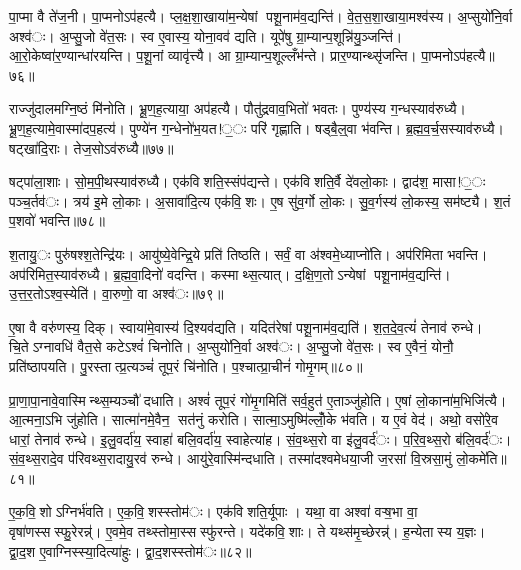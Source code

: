 पा॒प्मा वै ते॑ज॒नी। पा॒प्मनोऽप॑हत्यै। प्ल॒क्ष॒शा॒खाया॑म॒न्येषां पशू॒नाम॑व॒द्यन्ति॑। वे॒त॒स॒शा॒खाया॒मश्व॑स्य। अ॒प्सुयो॑नि॒र्वा अश्व॑ः। अ॒प्सु॒जो वे॑त॒सः। स्व ए॒वास्य॒ योना॒वव॑ द्यति। यूपे॑षु ग्रा॒म्यान्प॒शून्नि॑यु॒ञ्जन्ति॑। आ॒रो॒केष्वा॑र॒ण्यान्धा॑रयन्ति। प॒शू॒नां व्यावृ॑त्त्यै। आ ग्रा॒म्यान्प॒शूल्लँभ॑न्ते। प्रार॒ण्यान्थ्सृ॑जन्ति। पा॒प्मनोऽप॑हत्यै॥७६॥


राज्जु॑दालमग्नि॒ष्ठं मि॑नोति। भ्रू॒ण॒ह॒त्याया॒ अप॑हत्यै। पौतु॑द्रवाव॒भितो॑ भवतः। पुण्य॑स्य ग॒न्धस्याव॑रुध्यै। भ्रू॒ण॒ह॒त्यामे॒वास्मा॑दप॒हत्य॑। पुण्ये॑न ग॒न्धेनो॑भ॒यत!॒ः परि॑ गृह्णाति। षड्बै॒ल्॒वा भ॑वन्ति। ब्र॒ह्म॒व॒र्च॒सस्याव॑रुध्यै। षट्खा॑दि॒राः। तेज॒सोऽव॑रुध्यै॥७७॥

षट्पा॑ला॒शाः। सो॒म॒पी॒थस्याव॑रुध्यै। एक॑विशति॒स्संप॑द्यन्ते। एक॑विशति॒र्वै दे॑वलो॒काः। द्वाद॑श॒ मासा!॒ः पञ्च॒र्तव॑ः। त्रय॑ इ॒मे लो॒काः। अ॒सावा॑दि॒त्य एक॑वि॒शः। ए॒ष सु॑व॒र्गो लो॒कः। सु॒व॒र्गस्य॑ लो॒कस्य॒ सम॑ष्ट्यै। श॒तं प॒शवो॑ भवन्ति॥७८॥

श॒तायु॒ः पुरु॑षश्श॒तेन्द्रि॑यः। आयु॑ष्ये॒वेन्द्रि॒ये प्रति॑ तिष्ठति। सर्वं॒ वा अ॑श्वमे॒ध्याप्नो॑ति। अप॑रिमिता भवन्ति। अप॑रिमित॒स्याव॑रुध्यै। ब्र॒ह्म॒वा॒दिनो॑ वदन्ति। कस्माथ्स॒त्यात्। द॒क्षि॒ण॒तोऽन्येषां पशू॒नाम॑व॒द्यन्ति॑। उ॒त्त॒र॒तोऽश्व॒स्येति॑। वा॒रुणो॒ वा अश्व॑ः॥७९॥

ए॒षा वै वरु॑णस्य॒ दिक्। स्वाया॑मे॒वास्य॑ दि॒श्यव॑द्यति। यदित॑रेषां पशू॒नाम॑व॒द्यति॑। श॒त॒दे॒व॒त्यं॑ तेनाव॑ रुन्धे। चि॒तेऽग्नावधि॑ वैत॒से कटेऽश्वं॑ चिनोति। अ॒प्सुयो॑नि॒र्वा अश्व॑ः। अ॒प्सु॒जो वे॑त॒सः। स्व ए॒वैनं॒ योनौ॒ प्रति॑ष्ठापयति। पु॒रस्तात्प्र॒त्यञ्चं॑ तूप॒रं चि॑नोति। प॒श्चात्प्रा॒चीनं॑ गोमृ॒गम्॥८०॥

प्रा॒णा॒पा॒नावे॒वास्मिन्थ्स॒म्यञ्चौ॑ दधाति। अश्वं॑ तूप॒रं गो॑मृ॒गमिति॑ सर्व॒हुत॑ ए॒ताञ्जु॑होति। ए॒षां लो॒काना॑म॒भिजि॑त्यै। आ॒त्मना॒ऽभि जु॑होति। सात्मा॑नमे॒वैन॒ सत॑नुं करोति। सात्मा॒ऽमुष्मि॑ल्लोँ॒के भ॑वति। य ए॒वं वेद॑। अथो॒ वसो॑रे॒व धारां॒ तेनाव॑ रुन्धे। इ॒लु॒वर्दा॑य॒ स्वाहा॑ बलि॒वर्दा॑य॒ स्वाहेत्या॑ह। सं॒व॒थ्स॒रो वा इ॑लु॒वर्द॑ः। प॒रि॒व॒थ्स॒रो ब॑लि॒वर्द॑ः। सं॒व॒थ्स॒रादे॒व प॑रिवथ्स॒रादायु॒रव॑ रुन्धे। आयु॑रे॒वास्मि॑न्दधाति। तस्मा॑दश्वमेधया॒जी ज॒रसा॑ वि॒स्रसा॒मुं लो॒कमे॑ति॥८१॥


ए॒क॒वि॒शोऽग्निर्भ॑वति। ए॒क॒वि॒शस्स्तोम॑ः। एक॑विशति॒र्यूपाः। यथा॒ वा अश्वा॑ वऱ्ष॒भा वा॒ वृषा॑णस्सस्फु॒रेरन्न्॑। ए॒वमे॒व तथ्स्तोमा॒स्सस्फु॑रन्ते। यदे॑कवि॒शाः। ते यथ्स॑मृ॒च्छेरन्न्॑। ह॒न्येतास्य य॒ज्ञः। द्वा॒द॒श ए॒वाग्निस्स्या॒दित्या॑हुः। द्वा॒द॒शस्स्तोम॑ः॥८२॥


